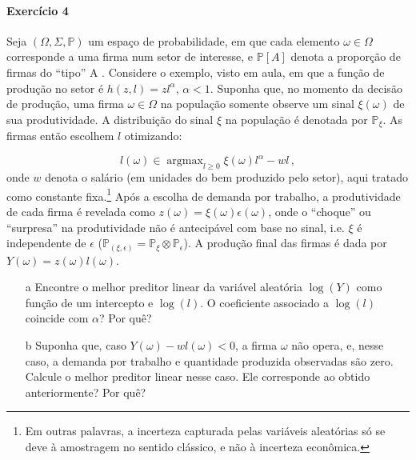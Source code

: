 \documentclass[10pt,a4paper]{article}
\begin{document}
 \paragraph{Exercício 4} Seja $(\Omega, \Sigma,\mathbb{P})$ um espaço de probabilidade, em que cada elemento $\omega \in \Omega$ corresponde a uma firma num setor de interesse, e $\mathbb{P}[A]$ denota a proporção de firmas do ``tipo'' A . Considere o exemplo, visto em aula, em que a função de produção no setor é $h(z,l) = zl^{\alpha}$, $\alpha < 1$. Suponha que, no momento da decisão de produção, uma firma $\omega \in \Omega$ na população somente observe um sinal $\xi(\omega)$ de sua produtividade. A distribuição do sinal $\xi$ na população é denotada por $\mathbb{P}_\xi$. As firmas então escolhem $l$ otimizando:
 
 $$l(\omega) \in \operatorname{argmax}_{l \geq 0} \xi(\omega) l^{\alpha}- w l\, ,$$
onde $w$ denota o salário (em unidades do bem produzido pelo setor), aqui tratado como constante fixa.\footnote{Em outras palavras, a incerteza capturada pelas variáveis aleatórias só se deve à amostragem no sentido clássico, e não à incerteza econômica.} Após a escolha de demanda por trabalho, a produtividade de cada firma é revelada como $z(\omega) = \xi(\omega)\epsilon(\omega)$, onde o ``choque'' ou ``surpresa'' na produtividade  não é antecipável com base no sinal, i.e. $\xi$ é independente de $\epsilon$  ($\mathbb{P}_{(\xi,\epsilon)}  = \mathbb{P}_{\xi}\otimes \mathbb{P}_{\epsilon}$). A produção final das firmas é dada por $Y(\omega) = z(\omega) l(\omega)$.

\begin{itemize}
	\item[a] Encontre o melhor preditor linear da variável aleatória $\log(Y)$ como função de um intercepto e $\log(l)$. O coeficiente associado a $\log(l)$ coincide com $\alpha$? Por quê?
	\item[b] Suponha que, caso $Y(\omega) - wl(\omega)<0$, a firma $\omega$ não opera, e, nesse caso, a demanda por trabalho e quantidade produzida observadas são zero. Calcule o melhor preditor linear nesse caso. Ele corresponde ao obtido anteriormente? Por quê?
\end{itemize}


 
\end{document}
